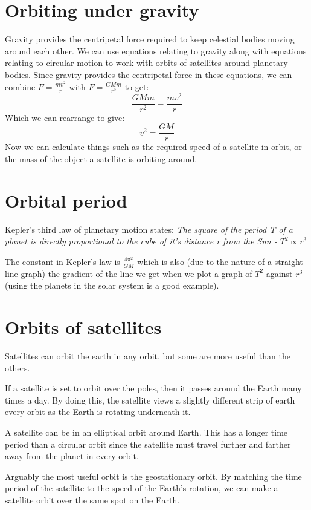 \documentclass{article}
\begin{document}
\section*{Orbiting under gravity}
Gravity provides the centripetal force required to keep celestial bodies moving around each other. We can use equations relating to gravity along with equations relating to circular motion to work with orbits of satellites around planetary bodies. Since gravity provides the centripetal force in these equations, we can combine $F = \frac{mv^{2}}{r}$ with $F = \frac{GMm}{r^2}$ to get:
\[
	\frac{GMm}{r^2} = \frac{mv^{2}}{r}
\]
Which we can rearrange to give:
\[
	v^{2} = \frac{GM}{r}
\]
Now we can calculate things such as the required speed of a satellite in orbit, or the mass of the object a satellite is orbiting around.

\section*{Orbital period}
Kepler's third law of planetary motion states: \textit{The square of the period T of a planet is directly proportional to the cube of it's distance r from the Sun - $T^2 \propto r^3$}

The constant in Kepler's law is $\frac{4 \pi ^2}{GM}$ which is also (due to the nature of a straight line graph) the gradient of the line we get when we plot a graph of $T^2$ against $r^3$ (using the planets in the solar system is a good example).

\section*{Orbits of satellites}
Satellites can orbit the earth in any orbit, but some are more useful than the others.

If a satellite is set to orbit over the poles, then it passes around the Earth many times a day. By doing this, the satellite views a slightly different strip of earth every orbit as the Earth is rotating underneath it.

A satellite can be in an elliptical orbit around Earth. This has a longer time period than a circular orbit since the satellite must travel further and farther away from the planet in every orbit.

Arguably the most useful orbit is the geostationary orbit. By matching the time period of the satellite to the speed of the Earth's rotation, we can make a satellite orbit over the same spot on the Earth.
\end{document}
